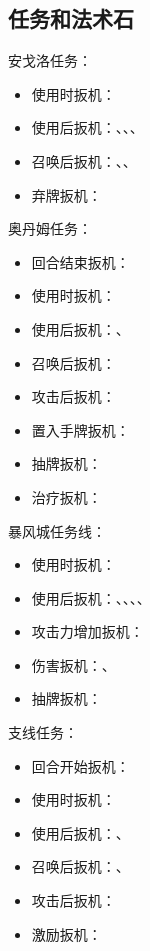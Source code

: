 \subsection{任务和法术石}
安戈洛任务：
\begin{itemize}
    \item 使用时扳机：
    \item 使用后扳机：、、、
    \item 召唤后扳机：、、
    \item 弃牌扳机：
\end{itemize}

奥丹姆任务：
\begin{itemize}
    \item 回合结束扳机：
    \item 使用时扳机：
    \item 使用后扳机：、
    \item 召唤后扳机：
    \item 攻击后扳机：
    \item 置入手牌扳机：
    \item 抽牌扳机：
    \item 治疗扳机：
\end{itemize}

暴风城任务线：
\begin{itemize}
    \item 使用时扳机：
    \item 使用后扳机：、、、、
    \item 攻击力增加扳机：
    \item 伤害扳机：、
    \item 抽牌扳机：
\end{itemize}

支线任务：
\begin{itemize}
    \item 回合开始扳机：
    \item 使用时扳机：
    \item 使用后扳机：、
    \item 召唤后扳机：、
    \item 攻击后扳机：
    \item 激励扳机：
\end{itemize}

